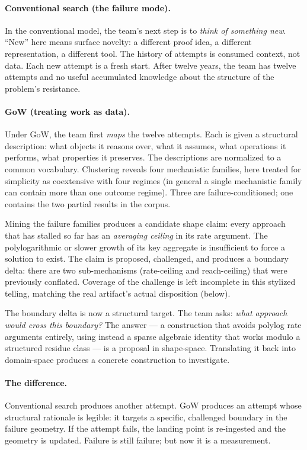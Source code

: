 \documentclass[11pt]{article}
\theoremstyle{gowthm}
\theoremstyle{gowplain}
\begin{document}
\paragraph{Conventional search (the failure mode).}
In the conventional model, the team's next step is to \emph{think of something
new}. ``New'' here means surface novelty: a different proof idea, a different
representation, a different tool. The history of attempts is consumed context,
not data. Each new attempt is a fresh start. After twelve years, the team has
twelve attempts and no useful accumulated knowledge about the structure of
the problem's resistance.

\paragraph{GoW (treating work as data).}
Under GoW, the team first \emph{maps} the twelve attempts. Each is given a
structural description: what objects it reasons over, what it assumes, what
operations it performs, what properties it preserves. The descriptions are
normalized to a common vocabulary. Clustering reveals four mechanistic families,
here treated for simplicity as coextensive with four regimes (in general a
single mechanistic family can contain more than one outcome regime).
Three are failure-conditioned; one contains the two partial results in the corpus.

Mining the failure families produces a candidate shape claim: every approach
that has stalled so far has an \emph{averaging ceiling} in its rate argument.
The polylogarithmic or slower growth of its key aggregate is insufficient to
force a solution to exist. The claim is proposed, challenged, and produces
a boundary delta: there are two sub-mechanisms (rate-ceiling and reach-ceiling)
that were previously conflated. Coverage of the challenge is left incomplete
in this stylized telling, matching the real artifact's actual disposition
(below).

The boundary delta is now a structural target. The team asks: \emph{what approach
would cross this boundary?} The answer --- a construction that avoids polylog
rate arguments entirely, using instead a sparse algebraic identity that works
modulo a structured residue class --- is a proposal in shape-space. Translating
it back into domain-space produces a concrete construction to investigate.

\paragraph{The difference.}
Conventional search produces another attempt. GoW produces an attempt whose
structural rationale is legible: it targets a specific, challenged
boundary in the failure geometry. If the attempt fails, the landing point is
re-ingested and the geometry is updated. Failure is still failure; but now it
is a measurement.
\end{document}
